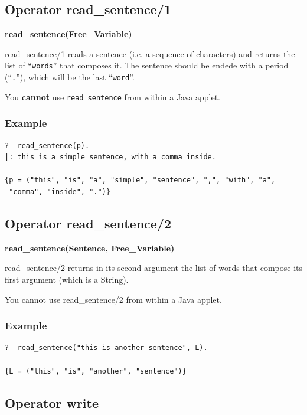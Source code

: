 \documentclass{book}
\begin{document}
\subsection{Operator read\_sentence/1}

{\bf read\_sentence(Free\_Variable)}

read\_sentence/1 reads a sentence (i.e. a sequence of characters) and
returns the list of ``\texttt{words}'' that composes it.  The sentence
should be endede with a period (``\texttt{.}''), which will be the
last ``\texttt{word}''.

You {\bf cannot} use \texttt{read\_sentence} from within a Java
applet.


\subsubsection{Example}


\begin{verbatim}
?- read_sentence(p).
|: this is a simple sentence, with a comma inside.

{p = ("this", "is", "a", "simple", "sentence", ",", "with", "a", 
 "comma", "inside", ".")}
\end{verbatim}



\subsection{Operator read\_sentence/2}

{\bf read\_sentence(Sentence, Free\_Variable)}

read\_sentence/2 returns in its second argument the list of words
that compose its first argument (which is a String).

You cannot use read\_sentence/2 from within a Java
applet.


\subsubsection{Example}


\begin{verbatim}
?- read_sentence("this is another sentence", L).

{L = ("this", "is", "another", "sentence")}
\end{verbatim}




\subsection{Operator write}
\end{document}

